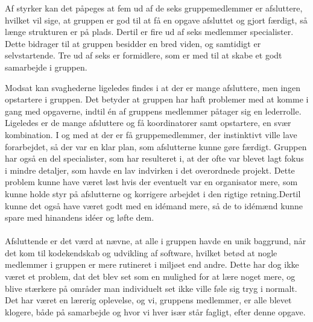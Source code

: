 Af styrker kan det påpeges at fem ud af de seks gruppemedlemmer er afsluttere, hvilket vil sige, at gruppen er god til at få en opgave afsluttet og gjort færdigt, så længe strukturen er på plads. Dertil er fire ud af seks medlemmer specialister. Dette bidrager til at gruppen besidder en bred viden, og samtidigt er selvstartende. Tre ud af seks er formidlere, som er med til at skabe et godt samarbejde i gruppen.

Modsat kan svaghederne ligeledes findes i at der er mange afsluttere, men ingen opstartere i gruppen. Det betyder at gruppen har haft problemer med at komme i gang med opgaverne, indtil én af gruppens medlemmer påtager sig en lederrolle. Ligeledes er de mange afsluttere og få koordinatorer samt opstartere, en svær kombination. I og med at der er få gruppemedlemmer, der instinktivt ville lave forarbejdet, så der var en klar plan, som afslutterne kunne gøre færdigt. Gruppen har også en del specialister, som har resulteret i, at der ofte var blevet lagt fokus i mindre detaljer, som havde en lav indvirken i det overordnede projekt. Dette problem kunne have været løst hvis der eventuelt var en organisator mere, som kunne holde styr på afslutterne og korrigere arbejdet i den rigtige retning.Dertil kunne det også have været godt med en idémand mere, så de to idémænd kunne spare med hinandens idéer og løfte dem. 
\\\\
Afsluttende er det værd at nævne, at alle i gruppen havde en unik baggrund, når det kom til kodekendskab og udvikling af software, hvilket betød at nogle medlemmer i gruppen er mere rutineret i miljøet end andre. Dette har dog ikke været et problem, dat det blev set som en mulighed for at lære noget mere, og blive stærkere på områder man individuelt set ikke ville føle sig tryg i normalt. Det har været en lærerig oplevelse, og vi, gruppens medlemmer, er alle blevet klogere, både på samarbejde og hvor vi hver især står fagligt, efter denne opgave.